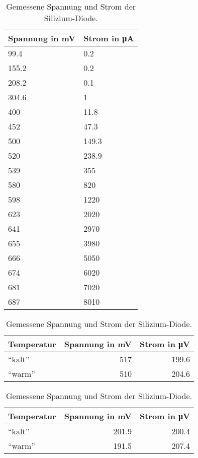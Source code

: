 \documentclass[
12pt,
a4paper,
bibliography=totocnumbered, %
BCOR=1cm, %
oneside, %
]{scrartcl}
\begin{document}
\begin{table}[H]
	\centering %
	\caption{Gemessene Spannung und Strom der Silizium-Diode.\label{tbl:SiDiode}}
	\begin{tabular}{ll}
		\toprule
		Spannung in \si{\milli\volt} & Strom in \si{\micro\ampere} \\
		\midrule
		\num{99,4}  & \num{0,2} \\
		\num{155,2}  & \num{0,2} \\
		\num{208,2}  & \num{0,1} \\
		\num{304,6}  & \num{1}  \\
		\num{400}  & \num{11,8}  \\
		\num{452}  & \num{47,3}  \\
		\num{500}  & \num{149,3} \\
		\num{520}  & \num{238,9} \\
		\num{539}  & \num{355} \\
		\num{580}  & \num{820} \\
		\num{598}  & \num{1220} \\
		\num{623}  & \num{2020} \\
		\num{641}  & \num{2970} \\
		\num{655}  & \num{3980} \\
		\num{666}  & \num{5050} \\
		\num{674}  & \num{6020} \\
		\num{681}  & \num{7020} \\
		\num{687}  & \num{8010} \\
		\bottomrule
	\end{tabular}
\end{table}

\begin{table}[H]
	\centering %
	\caption{Gemessene Spannung und Strom der Silizium-Diode.\label{tbl:TempSi}}
	\begin{tabular}{lrr}
		\toprule
		Temperatur & Spannung in \si{\milli\volt} & Strom in \si{\micro\volt} \\
		\midrule
		\enquote{kalt} & \num{517} & \num{199,6} \\
		\enquote{warm} & \num{510} & \num{204,6}\\
		\bottomrule
	\end{tabular}
\end{table}

\begin{table}[H]
	\centering %
	\caption{Gemessene Spannung und Strom der Silizium-Diode.\label{tbl:TempGe}}
	\begin{tabular}{lrr}
		\toprule
		Temperatur & Spannung in \si{\milli\volt} & Strom in \si{\micro\volt} \\
		\midrule
		\enquote{kalt} & \num{201,9} & \num{200,4} \\
		\enquote{warm} & \num{191,5} & \num{207,4} \\
		\bottomrule
	\end{tabular}
\end{table}
\end{document}
